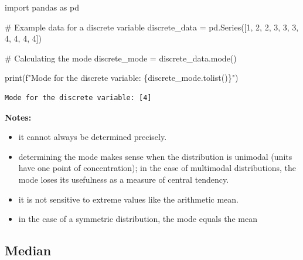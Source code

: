 \documentclass[
  english,
  letterpaper,
  DIV=11,
  numbers=noendperiod]{scrreprt}
\newenvironment{Shaded}{\begin{snugshade}}{\end{snugshade}}
\newcommand{\BuiltInTok}[1]{\textcolor[rgb]{0.00,0.23,0.31}{#1}}
\newcommand{\CommentTok}[1]{\textcolor[rgb]{0.37,0.37,0.37}{#1}}
\newcommand{\DecValTok}[1]{\textcolor[rgb]{0.68,0.00,0.00}{#1}}
\newcommand{\ImportTok}[1]{\textcolor[rgb]{0.00,0.46,0.62}{#1}}
\newcommand{\NormalTok}[1]{\textcolor[rgb]{0.00,0.23,0.31}{#1}}
\newcommand{\OperatorTok}[1]{\textcolor[rgb]{0.37,0.37,0.37}{#1}}
\newcommand{\SpecialCharTok}[1]{\textcolor[rgb]{0.37,0.37,0.37}{#1}}
\newcommand{\SpecialStringTok}[1]{\textcolor[rgb]{0.13,0.47,0.30}{#1}}
\providecommand{\tightlist}{%
  \setlength{\itemsep}{0pt}\setlength{\parskip}{0pt}}
\begin{document}
\begin{Shaded}
\begin{Highlighting}[]
\ImportTok{import}\NormalTok{ pandas }\ImportTok{as}\NormalTok{ pd}

\CommentTok{\# Example data for a discrete variable}
\NormalTok{discrete\_data }\OperatorTok{=}\NormalTok{ pd.Series([}\DecValTok{1}\NormalTok{, }\DecValTok{2}\NormalTok{, }\DecValTok{2}\NormalTok{, }\DecValTok{3}\NormalTok{, }\DecValTok{3}\NormalTok{, }\DecValTok{3}\NormalTok{, }\DecValTok{4}\NormalTok{, }\DecValTok{4}\NormalTok{, }\DecValTok{4}\NormalTok{, }\DecValTok{4}\NormalTok{])}

\CommentTok{\# Calculating the mode}
\NormalTok{discrete\_mode }\OperatorTok{=}\NormalTok{ discrete\_data.mode()}

\BuiltInTok{print}\NormalTok{(}\SpecialStringTok{f"Mode for the discrete variable: }\SpecialCharTok{\{}\NormalTok{discrete\_mode}\SpecialCharTok{.}\NormalTok{tolist()}\SpecialCharTok{\}}\SpecialStringTok{"}\NormalTok{)}
\end{Highlighting}
\end{Shaded}

\begin{verbatim}
Mode for the discrete variable: [4]
\end{verbatim}

\textbf{Notes:}

\begin{itemize}
\tightlist
\item
  it cannot always be determined precisely.
\item
  determining the mode makes sense when the distribution is unimodal
  (units have one point of concentration); in the case of multimodal
  distributions, the mode loses its usefulness as a measure of central
  tendency.
\item
  it is not sensitive to extreme values like the arithmetic mean.
\item
  in the case of a symmetric distribution, the mode equals the mean
\end{itemize}

\subsection{Median}\label{median}
\end{document}
